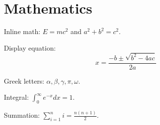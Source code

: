 \documentclass{article}
\begin{document}
\section{Mathematics}

Inline math: $E = mc^2$ and $a^2 + b^2 = c^2$.

Display equation:
\begin{equation}
x = \frac{-b \pm \sqrt{b^2 - 4ac}}{2a}
\end{equation}

Greek letters: $\alpha, \beta, \gamma, \pi, \omega$.

Integral: $\int_0^\infty e^{-x} dx = 1$.

Summation: $\sum_{i=1}^n i = \frac{n(n+1)}{2}$.
\end{document}
